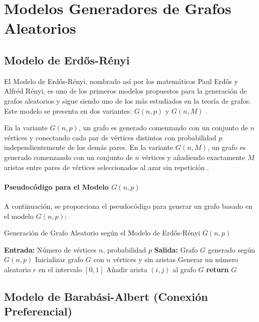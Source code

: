 \section{Modelos Generadores de Grafos Aleatorios}

\subsection{Modelo de Erdős-Rényi}

El Modelo de Erdős-Rényi, nombrado así por los matemáticos Paul Erdős y Alfréd Rényi, es uno de los primeros modelos propuestos para la generación de grafos aleatorios y sigue siendo uno de los más estudiados en la teoría de grafos. Este modelo se presenta en dos variantes: $G(n, p)$ y $G(n, M)$ .

En la variante $G(n, p)$, un grafo es generado comenzando con un conjunto de $n$ vértices y conectando cada par de vértices distintos con probabilidad $p$ independientemente de los demás pares. En la variante $G(n, M)$, un grafo es generado comenzando con un conjunto de $n$ vértices y añadiendo exactamente $M$ aristas entre pares de vértices seleccionados al azar sin repetición \citep{Erdos1959} .

\paragraph{Pseudocódigo para el Modelo $G(n, p)$}

A continuación, se proporciona el pseudocódigo para generar un grafo basado en el modelo $G(n, p)$:

\begin{algorithm}
\caption{Generación de Grafo Aleatorio según el Modelo de Erdős-Rényi $G(n, p)$}
\begin{algorithmic}[1]
\State \textbf{Entrada:} Número de vértices $n$, probabilidad $p$
\State \textbf{Salida:} Grafo $G$ generado según $G(n, p)$
    \State Inicializar grafo $G$ con $n$ vértices y sin aristas
        \State Generar un número aleatorio $r$ en el intervalo $[0, 1]$
            \State Añadir arista $(i, j)$ al grafo $G$
        \EndIf
    \EndFor
    \State \textbf{return} $G$
\EndProcedure
\end{algorithmic}
\end{algorithm}


\subsection{Modelo de Barabási-Albert (Conexión Preferencial)}

